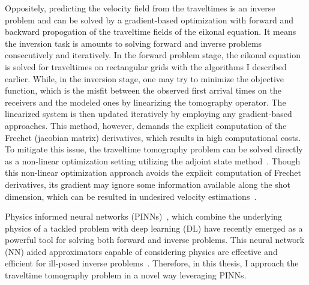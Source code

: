 Oppositely, predicting the velocity
field from the traveltimes is an inverse problem and can be solved by a gradient-based 
optimization with forward and backward propogation of the traveltime fields of the 
eikonal equation. 
It means the inversion task is 
amounts to solving forward and 
inverse problems consecutively and iteratively. 
In the forward problem stage, 
the eikonal equation is solved for traveltimes on rectangular grids with the algorithms I described earlier. While, in the inversion stage, one may try to minimize the objective function, which is the misfit between the observed first arrival times on the receivers and the modeled ones by linearizing the tomography operator. The linearized system is then updated iteratively by employing any gradient-based approaches. This method, however, demands the explicit computation of the Frechet (jacobian matrix) derivatives, which results in high computational costs. To mitigate this issue, the traveltime tomography problem can be solved directly as a non-linear optimization setting utilizing the adjoint state method~\cite{lq:06,p:06}. Though this non-linear optimization approach avoids the explicit computation of Frechet derivatives, its gradient may ignore some information available along the shot dimension, which can be resulted in undesired velocity estimations~\cite{lvf:13}.

Physics informed neural networks (PINNs)~\cite{rpk:19}, which combine the underlying physics of a tackled problem with deep learning (DL) have recently emerged as a powerful tool for solving both forward and inverse problems. This neural network (NN) aided approximators capable of considering physics are effective and efficient for ill-posed inverse problems~\cite{kklpwy:21}. Therefore, in this thesis, I approach the traveltime tomography problem in a novel way leveraging PINNs.
